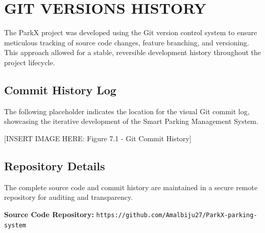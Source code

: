 \chapter{GIT VERSIONS HISTORY}
The ParkX project was developed using the Git version control system to ensure meticulous tracking of source code changes, feature branching, and versioning. This approach allowed for a stable, reversible development history throughout the project lifecycle.

\section{Commit History Log}
The following placeholder indicates the location for the visual Git commit log, showcasing the iterative development of the Smart Parking Management System.

\vspace{1.5cm}
[INSERT IMAGE HERE: Figure 7.1 - Git Commit History] \label{fig:git}
\vspace{1.5cm}

\section{Repository Details}
The complete source code and commit history are maintained in a secure remote repository for auditing and transparency.

\noindent
\textbf{Source Code Repository:} \texttt{https://github.com/Amalbiju27/ParkX-parking-system}
